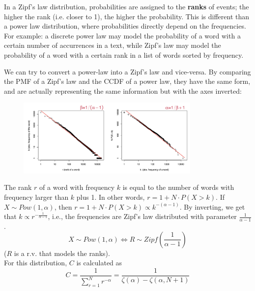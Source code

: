 In a Zipf's law distribution, probabilities are assigned to the \textbf{ranks} of events; the higher the rank (i.e. closer to 1), the higher the probability. This is different than a power law distribution, where probabilities directly depend on the frequencies. For example: a discrete power law may model the probability of a word with a certain number of accurrences in a text, while Zipf's law may model the probability of a word with a certain rank in a list of words sorted by frequency.

We can try to convert a power-law into a Zipf's law and vice-versa. By comparing the PMF of a Zipf's law and the CCDF of a power law, they have the same form, and are actually representing the same information but with the axes inverted:

\begin{figure}[ht]
    \centering
    \includegraphics*[width=0.8\textwidth]{img/zipf_vs_ccdf.png}
\end{figure}
The rank $r$ of a word with frequency $k$ is equal to the number of words with frequency larger than $k$ plus 1. In other words, $r = 1 + N \cdot P(X > k)$. If $X \sim Pow(1, \alpha)$, then $r = 1 + N \cdot P(X > k) \propto k^{-{(\alpha - 1)}}$. By inverting, we get that $k \propto r^{-\frac{1}{\alpha - 1}}$, i.e., the frequencies are Zipf's law distributed with parameter $\frac{1}{\alpha - 1}$.
\[
    X \sim Pow(1, \alpha) \iff R \sim Zipf \left (\frac{1}{\alpha - 1} \right )
\]
($R$ is a r.v. that models the ranks).\\
For this distribution, $C$ is calculated as
\begin{equation*}
    C = \frac{1}{\sum_{r=1}^{N} r^{-\alpha}} = \frac{1}{\zeta(\alpha) - \zeta(\alpha, N+1)}
\end{equation*}